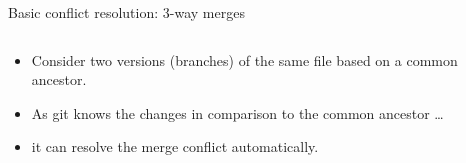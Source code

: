 \begin{frame}{Basic conflict resolution: 3-way merges}
\begin{columns}
\begin{column}{0.5\textwidth}
\begin{minipage}[c][0.5\textheight][c]{\textwidth}
    \end{minipage}

    \begin{minipage}[t]{\textwidth}
      \begin{itemize}
        \item<1-> Consider two versions (branches) of the same file based on a \alert{common ancestor}.
        \item<2-> As git \alert{knows the changes} in comparison to the common ancestor \dots
        \item<3-> it can \alert{resolve} the merge conflict \alert{automatically}.
      \end{itemize}
    \end{minipage}
  \end{column}
  \end{columns}

\end{frame}
